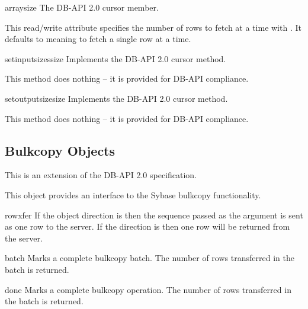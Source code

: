 \begin{memberdesc}[Cursor]{arraysize}
The DB-API 2.0 cursor  member.

This read/write attribute specifies the number of rows to fetch at a
time with .  It defaults to  meaning to
fetch a single row at a time.
\end{memberdesc}

\begin{methoddesc}[Cursor]{setinputsizes}{size}
Implements the DB-API 2.0 cursor  method.

This method does nothing -- it is provided for DB-API compliance.
\end{methoddesc}

\begin{methoddesc}[Cursor]{setoutputsize}{size }
Implements the DB-API 2.0 cursor  method.

This method does nothing -- it is provided for DB-API compliance.
\end{methoddesc}

\subsection{Bulkcopy Objects}

This is an extension of the DB-API 2.0 specification.

This object provides an interface to the Sybase bulkcopy
functionality.

\begin{methoddesc}[Bulkcopy]{rowxfer}{}
If the  object direction is  then the
sequence passed as the  argument is sent as one row to the
server.  If the direction is  then one row will be
returned from the server.
\end{methoddesc}

\begin{methoddesc}[Bulkcopy]{batch}{}
Marks a complete bulkcopy batch.  The number of rows transferred in
the batch is returned.
\end{methoddesc}

\begin{methoddesc}[Bulkcopy]{done}{}
Marks a complete bulkcopy operation.  The number of rows transferred
in the batch is returned.
\end{methoddesc}
